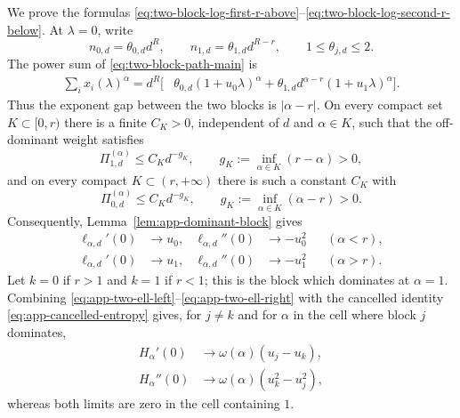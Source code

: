 \documentclass[aps,pra,11pt,onecolumn,nofootinbib,tightenlines]{revtex4-2}
\theoremstyle{definition}
\begin{document}
We prove the formulas \eqref{eq:two-block-log-first-r-above}--\eqref{eq:two-block-log-second-r-below}.  At $\lambda=0$, write
\begin{equation}
 n_{0,d}=\theta_{0,d}d^R,
 \qquad
 n_{1,d}=\theta_{1,d}d^{R-r},
 \qquad
 1\leq\theta_{j,d}\leq2.
 \label{eq:app-two-ceiling-factors}
\end{equation}
The power sum of \eqref{eq:two-block-path-main} is
\begin{align}
 \sum_i x_i(\lambda)^\alpha
 =d^R\bigl[&\theta_{0,d}(1+u_0\lambda)^\alpha
 +\theta_{1,d}d^{\alpha-r}(1+u_1\lambda)^\alpha\bigr].
 \label{eq:app-two-power-sum}
\end{align}
Thus the exponent gap between the two blocks is $|\alpha-r|$.  On every compact
set $K\subset[0,r)$ there is a finite $C_K>0$, independent of $d$ and
$\alpha\in K$, such that the off-dominant weight satisfies
\begin{equation}
 \Pi_{1,d}^{(\alpha)}\leq C_Kd^{-g_K},
 \qquad
 g_K:=\inf_{\alpha\in K}(r-\alpha)>0,
 \label{eq:app-two-left-gap}
\end{equation}
and on every compact $K\subset(r,+\infty)$ there is such a constant $C_K$ with
\begin{equation}
 \Pi_{0,d}^{(\alpha)}\leq C_Kd^{-g_K},
 \qquad
 g_K:=\inf_{\alpha\in K}(\alpha-r)>0.
 \label{eq:app-two-right-gap}
\end{equation}
Consequently, Lemma~\ref{lem:app-dominant-block} gives
\begin{align}
 \ell_{\alpha,d}'(0)&\longrightarrow u_0,
 &\ell_{\alpha,d}''(0)&\longrightarrow-u_0^2
 &&(\alpha<r),
 \label{eq:app-two-ell-left}\\
 \ell_{\alpha,d}'(0)&\longrightarrow u_1,
 &\ell_{\alpha,d}''(0)&\longrightarrow-u_1^2
 &&(\alpha>r).
 \label{eq:app-two-ell-right}
\end{align}
Let $k=0$ if $r>1$ and $k=1$ if $r<1$; this is the block which dominates at $\alpha=1$.  Combining \eqref{eq:app-two-ell-left}--\eqref{eq:app-two-ell-right} with the cancelled identity \eqref{eq:app-cancelled-entropy} gives, for $j\neq k$ and for $\alpha$ in the cell where block $j$ dominates,
\begin{align}
 H_\alpha'(0)&\longrightarrow\omega(\alpha)(u_j-u_k),
 \label{eq:app-two-H-first-pointwise}\\
 H_\alpha''(0)&\longrightarrow\omega(\alpha)(u_k^2-u_j^2),
 \label{eq:app-two-H-second-pointwise}
\end{align}
whereas both limits are zero in the cell containing $1$.
\end{document}
